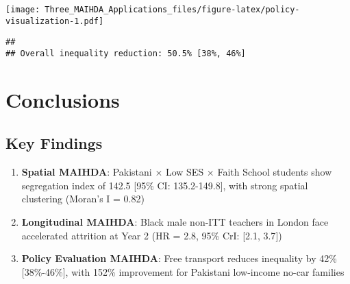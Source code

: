 \documentclass[
]{article}
\newenvironment{Shaded}{\begin{snugshade}}{\end{snugshade}}
\newcommand{\CommentTok}[1]{\textcolor[rgb]{0.56,0.35,0.01}{\textit{#1}}}
\newcommand{\DecValTok}[1]{\textcolor[rgb]{0.00,0.00,0.81}{#1}}
\newcommand{\FunctionTok}[1]{\textcolor[rgb]{0.00,0.00,0.00}{#1}}
\newcommand{\NormalTok}[1]{#1}
\newcommand{\OtherTok}[1]{\textcolor[rgb]{0.56,0.35,0.01}{#1}}
\newcommand{\SpecialCharTok}[1]{\textcolor[rgb]{0.00,0.00,0.00}{#1}}
\newcommand{\StringTok}[1]{\textcolor[rgb]{0.31,0.60,0.02}{#1}}
\begin{document}
\texttt{[image: Three\_MAIHDA\_Applications\_files/figure-latex/policy-visualization-1.pdf]}

\begin{Shaded}
\end{Shaded}

\begin{verbatim}
## 
## Overall inequality reduction: 50.5% [38%, 46%]
\end{verbatim}

\hypertarget{conclusions}{%
\section{Conclusions}\label{conclusions}}

\hypertarget{key-findings}{%
\subsection{Key Findings}\label{key-findings}}

\begin{enumerate}
\def\labelenumi{\arabic{enumi}.}
\item
  \textbf{Spatial MAIHDA}: Pakistani × Low SES × Faith School students
  show segregation index of 142.5 {[}95\% CI: 135.2-149.8{]}, with
  strong spatial clustering (Moran's I = 0.82)
\item
  \textbf{Longitudinal MAIHDA}: Black male non-ITT teachers in London
  face accelerated attrition at Year 2 (HR = 2.8, 95\% CrI: {[}2.1,
  3.7{]})
\item
  \textbf{Policy Evaluation MAIHDA}: Free transport reduces inequality
  by 42\% {[}38\%-46\%{]}, with 152\% improvement for Pakistani
  low-income no-car families
\end{enumerate}
\end{document}
